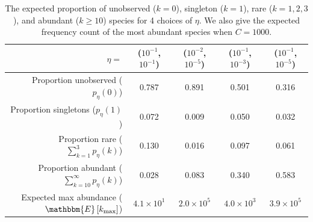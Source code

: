 \documentclass[12pt]{article}
\begin{document}


\begin{table}[t]
\caption{The expected proportion of unobserved ($k=0$), singleton ($k=1$), rare ($k=1,2,3$), and abundant  ($k \geq 10$) species for 4 choices of $\eta$.  We also give the expected frequency count of the most abundant species when $C = 1000$.
\label{tab:eta_intuition}}
\centering
\footnotesize
\begin{tabular}{rcccc}
  \hline
 $\eta = $ & ($10^{-1}$, $10^{-1}$) & ($10^{-2}$, $10^{-5}$) & ($10^{-1}$, $10^{-3}$) & ($10^{-1}$, $10^{-5}$) \\
  \hline
  Proportion unobserved ($p_{\eta}(0)$) & 0.787 & 0.891 & 0.501 & 0.316 \\
  Proportion singletons ($p_{\eta}(1)$) & 0.072 & 0.009 & 0.050 & 0.032 \\
  Proportion rare ($\sum_{k=1}^3 p_{\eta}(k)$) & 0.130 & 0.016 & 0.097 & 0.061 \\
  Proportion abundant ($\sum_{k=10}^{\infty} p_{\eta}(k)$) & 0.028 & 0.083 & 0.340 & 0.583 \\
Expected max abundance ($\mathbbm{E}\left[k_{\text{max}}\right]$) & $4.1 \times 10^{1}$ & $2.0 \times 10^{5}$ & $4.0 \times 10^{3}$ & $3.9 \times 10^{5}$ \\
   \hline
\end{tabular}
\normalsize
\end{table}
\end{document}
